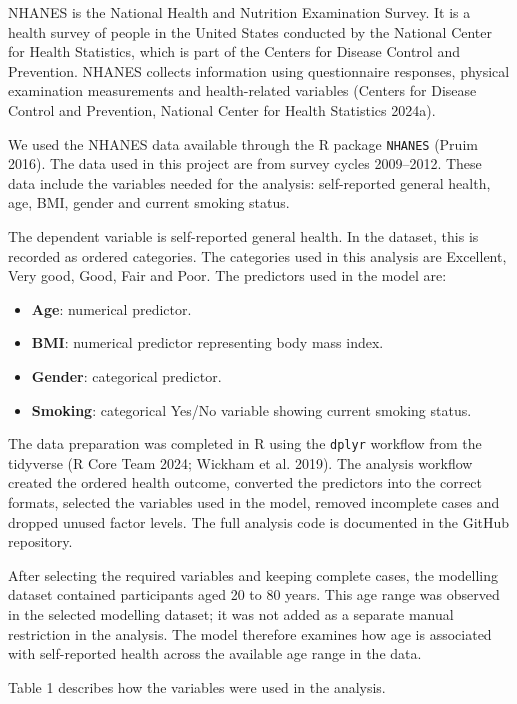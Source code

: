 \documentclass{article}
\providecommand{\tightlist}{%
  \setlength{\itemsep}{0pt}\setlength{\parskip}{0pt}}
\begin{document}
NHANES is the National Health and Nutrition Examination Survey. It is a
health survey of people in the United States conducted by the National
Center for Health Statistics, which is part of the Centers for Disease
Control and Prevention. NHANES collects information using questionnaire
responses, physical examination measurements and health-related
variables (Centers for Disease Control and Prevention, National Center
for Health Statistics 2024a).

We used the NHANES data available through the R package \texttt{NHANES}
(Pruim 2016). The data used in this project are from survey cycles
2009--2012. These data include the variables needed for the analysis:
self-reported general health, age, BMI, gender and current smoking
status.

The dependent variable is self-reported general health. In the dataset,
this is recorded as ordered categories. The categories used in this
analysis are Excellent, Very good, Good, Fair and Poor. The predictors
used in the model are:

\begin{itemize}
\tightlist
\item
  \textbf{Age}: numerical predictor.
\item
  \textbf{BMI}: numerical predictor representing body mass index.
\item
  \textbf{Gender}: categorical predictor.
\item
  \textbf{Smoking}: categorical Yes/No variable showing current smoking
  status.
\end{itemize}

The data preparation was completed in R using the \texttt{dplyr}
workflow from the tidyverse (R Core Team 2024; Wickham et al. 2019). The
analysis workflow created the ordered health outcome, converted the
predictors into the correct formats, selected the variables used in the
model, removed incomplete cases and dropped unused factor levels. The
full analysis code is documented in the GitHub repository.

After selecting the required variables and keeping complete cases, the
modelling dataset contained participants aged 20 to 80 years. This age
range was observed in the selected modelling dataset; it was not added
as a separate manual restriction in the analysis. The model therefore
examines how age is associated with self-reported health across the
available age range in the data.

Table 1 describes how the variables were used in the analysis.
\end{document}
